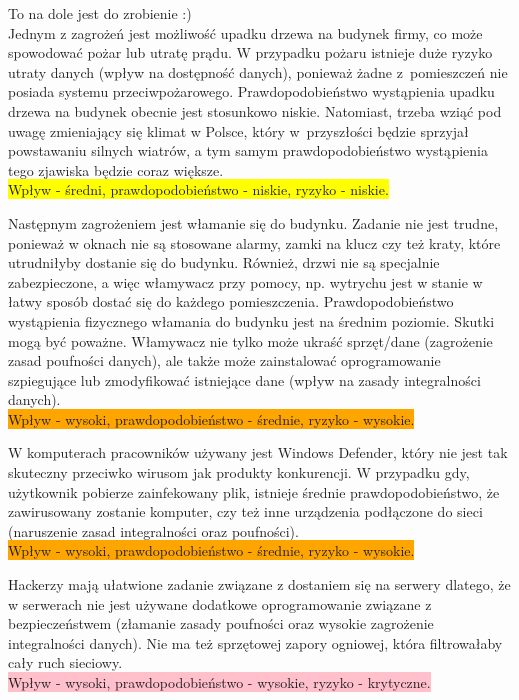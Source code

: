 To na dole jest do zrobienie :)  \\
Jednym z zagrożeń jest możliwość upadku drzewa na budynek firmy, co może spowodować pożar lub utratę prądu. W przypadku pożaru istnieje duże ryzyko utraty danych (wpływ na dostępność danych), ponieważ żadne z~pomieszczeń nie posiada systemu przeciwpożarowego.  Prawdopodobieństwo wystąpienia upadku drzewa na budynek obecnie jest stosunkowo niskie. Natomiast, trzeba wziąć pod uwagę zmieniający się klimat w Polsce, który w~przyszłości będzie sprzyjał powstawaniu silnych wiatrów, a tym samym prawdopodobieństwo wystąpienia tego zjawiska będzie coraz większe. \\ \colorbox{yellow}{Wpływ - średni, prawdopodobieństwo - niskie, ryzyko - niskie.}

Następnym zagrożeniem jest włamanie się do budynku. Zadanie nie jest trudne, ponieważ w oknach nie są stosowane alarmy, zamki na klucz czy też kraty, które utrudniłyby dostanie się do budynku. Również, drzwi nie są specjalnie zabezpieczone, a więc włamywacz przy pomocy, np. wytrychu jest w stanie w łatwy sposób dostać się do każdego pomieszczenia. Prawdopodobieństwo wystąpienia fizycznego włamania do budynku jest na średnim poziomie. Skutki mogą być poważne. Włamywacz nie tylko może ukraść sprzęt/dane (zagrożenie zasad poufności danych), ale także może zainstalować oprogramowanie szpiegujące lub zmodyfikować istniejące dane (wpływ na zasady integralności danych). \\ \colorbox{orange}{Wpływ - wysoki, prawdopodobieństwo - średnie, ryzyko - wysokie.}

W komputerach pracowników używany jest Windows Defender, który nie jest tak skuteczny przeciwko wirusom jak produkty konkurencji. W przypadku gdy, użytkownik pobierze zainfekowany plik, istnieje średnie prawdopodobieństwo, że zawirusowany zostanie komputer, czy też inne urządzenia podłączone do sieci (naruszenie zasad integralności oraz poufności). \\ \colorbox{orange}{Wpływ - wysoki, prawdopodobieństwo - średnie, ryzyko - wysokie.}

Hackerzy mają ułatwione zadanie związane z dostaniem się na serwery dlatego, że w serwerach nie jest używane dodatkowe oprogramowanie związane z bezpieczeństwem (złamanie zasady poufności oraz wysokie zagrożenie integralności danych). Nie ma też sprzętowej zapory ogniowej, która filtrowałaby cały ruch sieciowy. \\ \colorbox{pink}{Wpływ - wysoki, prawdopodobieństwo - wysokie, ryzyko - krytyczne.}

